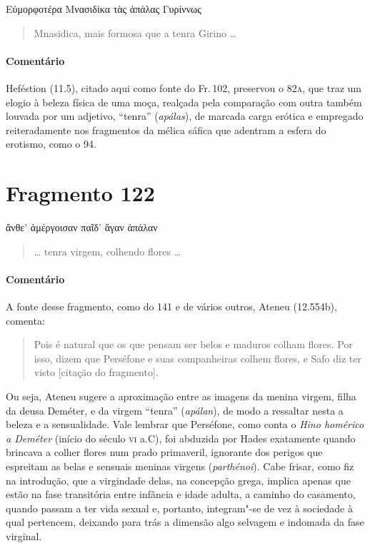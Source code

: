 \begin{gkverse}
Εὐμορφοτέρα Μνασιδίκα τὰς ἀπάλας Γυρίννως
\end{gkverse}

\begin{verse}
Mnasidica, mais formosa que a tenra Girino \ldots{}
\end{verse}

{\paragraph{Comentário} Heféstion (11.5), citado aqui como fonte do Fr.\,102, preservou o 82\textsc{a}, que traz
um elogio à beleza física de uma moça, realçada pela comparação com outra
também louvada por um adjetivo, ``tenra” (\textit{apálas}), de marcada
carga erótica e empregado reiteradamente nos fragmentos da mélica sáfica que
adentram a esfera do erotismo, como o 94.}

\section{Fragmento 122}

\begin{gkverse}
ἄνθε’ ἀμέργοισαν παῖδ’ ἄγαν ἀπάλαν
\end{gkverse}

\begin{verse}
\ldots{} tenra virgem, colhendo flores \ldots{}
\end{verse}

{\paragraph{Comentário} A fonte desse fragmento, como do 141 e de vários outros, Ateneu (12.554b), comenta: 

\begin{quote}
Pois é natural
que os que pensam ser belos e maduros colham flores. Por isso, dizem que
Perséfone e suas companheiras colhem flores, e Safo diz ter visto 
[citação do fragmento].
\end{quote}

 Ou seja, Ateneu sugere a aproximação entre as imagens
da menina virgem, filha da deusa Deméter, e da virgem ``tenra”
(\textit{apálan}), de modo a ressaltar nesta a beleza e a
sensualidade. Vale lembrar que Perséfone, como conta o \textit{Hino homérico a Deméter} 
(início do século \textsc{vi} a.C), foi abduzida por Hades exatamente
quando brincava a colher flores num prado primaveril, ignorante dos perigos que
espreitam as belas e sensuais meninas virgens (\textit{parthénoi}). Cabe frisar, como fiz na introdução, que a virgindade delas,
na concepção grega, implica
apenas que estão na fase transitória entre infância e idade
adulta, a caminho do casamento, quando passam a ter vida sexual e, portanto, integram"-se
de vez à sociedade à qual pertencem, deixando para trás a dimensão algo
selvagem e indomada da fase virginal.}



